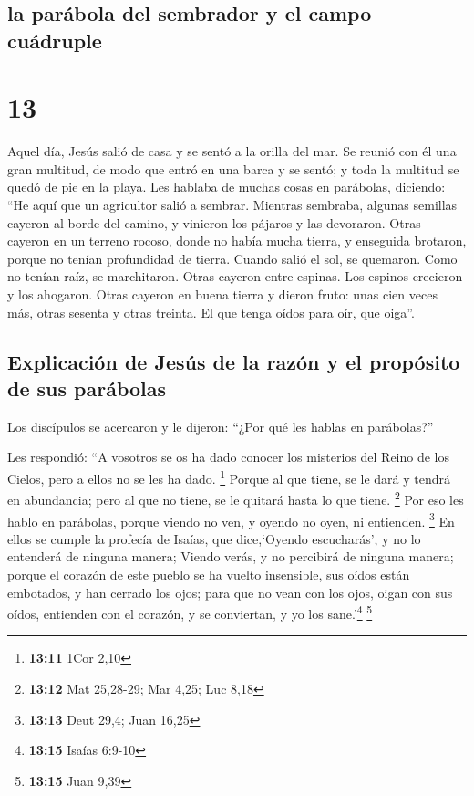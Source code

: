 \hypertarget{la-paruxe1bola-del-sembrador-y-el-campo-cuuxe1druple}{%
\subsection{la parábola del sembrador y el campo
cuádruple}\label{la-paruxe1bola-del-sembrador-y-el-campo-cuuxe1druple}}

\hypertarget{section-12}{%
\section{13}\label{section-12}}

 Aquel día, Jesús salió de casa y se sentó a la orilla del
mar.  Se reunió con él una gran multitud, de modo que
entró en una barca y se sentó; y toda la multitud se quedó de pie en la
playa.  Les hablaba de muchas cosas en parábolas,
diciendo: ``He aquí que un agricultor salió a sembrar. 
Mientras sembraba, algunas semillas cayeron al borde del camino, y
vinieron los pájaros y las devoraron.  Otras cayeron en un
terreno rocoso, donde no había mucha tierra, y enseguida brotaron,
porque no tenían profundidad de tierra.  Cuando salió el
sol, se quemaron. Como no tenían raíz, se marchitaron. 
Otras cayeron entre espinas. Los espinos crecieron y los ahogaron.
 Otras cayeron en buena tierra y dieron fruto: unas cien
veces más, otras sesenta y otras treinta.  El que tenga
oídos para oír, que oiga''.

\hypertarget{explicaciuxf3n-de-jesuxfas-de-la-razuxf3n-y-el-propuxf3sito-de-sus-paruxe1bolas}{%
\subsection{Explicación de Jesús de la razón y el propósito de sus
parábolas}\label{explicaciuxf3n-de-jesuxfas-de-la-razuxf3n-y-el-propuxf3sito-de-sus-paruxe1bolas}}

 Los discípulos se acercaron y le dijeron: ``¿Por qué les
hablas en parábolas?''

 Les respondió: ``A vosotros se os ha dado conocer los
misterios del Reino de los Cielos, pero a ellos no se les ha dado.
\footnote{\textbf{13:11} 1Cor 2,10}  Porque al que tiene,
se le dará y tendrá en abundancia; pero al que no tiene, se le quitará
hasta lo que tiene. \footnote{\textbf{13:12} Mat 25,28-29; Mar 4,25; Luc
  8,18}  Por eso les hablo en parábolas, porque viendo no
ven, y oyendo no oyen, ni entienden. \footnote{\textbf{13:13} Deut 29,4;
  Juan 16,25}  En ellos se cumple la profecía de Isaías,
que dice,`Oyendo escucharás', y no lo entenderá de ninguna manera;
Viendo verás, y no percibirá de ninguna manera;  porque
el corazón de este pueblo se ha vuelto insensible, sus oídos están
embotados, y han cerrado los ojos; para que no vean con los ojos, oigan
con sus oídos, entienden con el corazón, y se conviertan, y yo los
sane.'\footnote{\textbf{13:15} Isaías 6:9-10} \footnote{\textbf{13:15}
  Juan 9,39}

